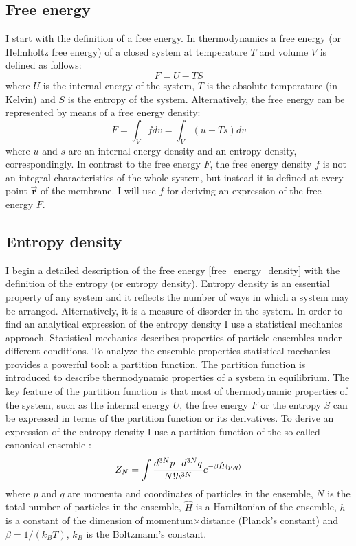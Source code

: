 \subsection{Free energy}

I start with the definition of a free energy. In thermodynamics a free energy (or Helmholtz free energy) of a closed system at temperature $T$ and volume $V$ is defined as follows:
\begin{equation}
 \label{free_energy}F=U-TS
\end{equation}
where $U$ is the internal energy of the system, $T$ is the absolute temperature (in Kelvin) and $S$ is the entropy of the system. Alternatively, the free energy can be represented by means of a free energy density:
\begin{equation}
 \label{free_energy_density}F=\int_V f dv=\int_V (u-Ts)dv
\end{equation}
where $u$ and $s$ are an internal energy density and an entropy density, correspondingly. In contrast to the free energy $F$, the free energy density $f$ is not an integral characteristics of the whole system, but instead it is defined at every point $\vec{\mathbf{r}}$ of the membrane. I will use $f$ for deriving an expression of the free energy $F$.

\subsection{Entropy density}

\label{entropy_density}

I begin a detailed description of the free energy \eqref{free_energy_density} with the definition of the entropy (or entropy density). Entropy density is an essential property of any system and it reflects the number of ways in which a system may be arranged. Alternatively, it is a measure of disorder in the system. In order to find an analytical expression of the entropy density I use a statistical mechanics approach. Statistical mechanics describes properties of particle ensembles under different conditions. To analyze the ensemble properties statistical mechanics provides a powerful tool: a partition function. The partition function is introduced to describe thermodynamic properties of a system in equilibrium. The key feature of the partition function is that most of thermodynamic properties of the system, such as the internal energy $U$, the free energy $F$ or the entropy $S$ can be expressed in terms of the partition function or its derivatives. To derive an expression of the entropy density I use a partition function of the so-called canonical ensemble \cite{Huang1963}:
\begin{equation}
\label{partition_function} Z_N=\int \frac{d^{3N}p\hspace{0.1in}d^{3N}q}{N!h^{3N}}e^{-\beta \hat{H}(p,q)}
\end{equation}
where $p$ and $q$ are momenta and coordinates of particles in the ensemble, $N$ is the total number of particles in the ensemble, $\hat{H}$ is a Hamiltonian of the ensemble, $h$ is a constant of the dimension of momentum$\times$distance (Planck's constant) and $\beta = 1/(k_BT)$, $k_B$ is the Boltzmann's constant. 

